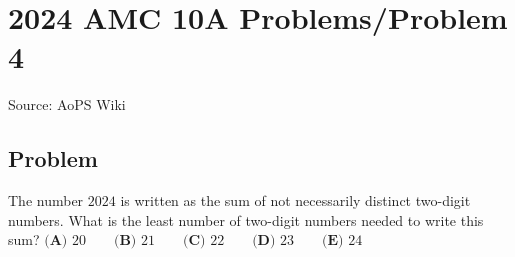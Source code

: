 \documentclass[12pt]{article}
\begin{document}
\section*{{2024 AMC 10A Problems/Problem 4}}
Source: AoPS Wiki

\subsection*{Problem}
The number $2024$ is written as the sum of not necessarily distinct two-digit numbers. What is the least number of two-digit numbers needed to write this sum? $\textbf{(A) }20\qquad\textbf{(B) }21\qquad\textbf{(C) }22\qquad\textbf{(D) }23\qquad\textbf{(E) }24$
\end{document}
